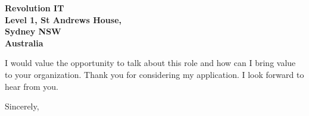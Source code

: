 \documentclass{letter}
\begin{document}
\begin{letter}{\bf Revolution IT\\Level 1, St Andrews House,\\Sydney NSW\\Australia}


I would value the opportunity to talk about this role and how can I bring value to your organization.   
Thank you for considering my application. I look forward to hear from you.




\closing{Sincerely,
} 

\end{letter}
\end{document}
